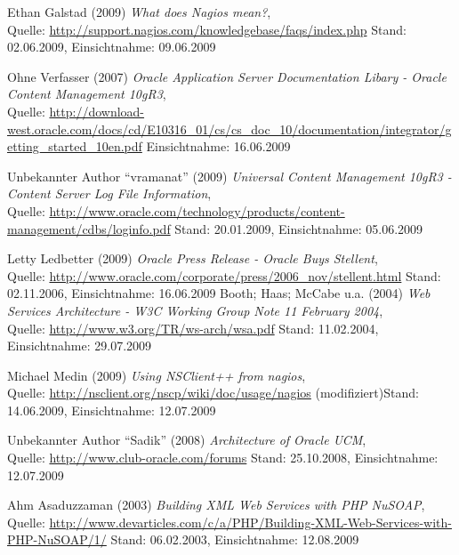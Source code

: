 \documentclass[12pt, a4paper, headsepline]{article}
\newcommand{\pictext}[1]{\glqq\textit{#1}\grqq }
\begin{document}
\begin{thebibliography}{xxxxxxxxxx}
 		 	 	  Ethan Galstad (2009) \pictext{What does Nagios mean?}, \\ Quelle: \url{http://support.nagios.com/knowledgebase/faqs/index.php} \newline Stand: 02.06.2009, Einsichtnahme: 09.06.2009 	 
	 
	  Ohne Verfasser (2007) \pictext{Oracle Application Server Documentation Libary - Oracle Content Management 10gR3}, \\ Quelle: \url{http://download-west.oracle.com/docs/cd/E10316_01/cs/cs_doc_10/documentation/integrator/getting_started_10en.pdf} \newline Einsichtnahme: 16.06.2009
	 
	 	  Unbekannter Author "`vramanat"' (2009) \pictext{Universal Content Management 10gR3 - Content Server Log File Information}, \\ Quelle: \url{http://www.oracle.com/technology/products/content-management/cdbs/loginfo.pdf} \newline Stand: 20.01.2009, Einsichtnahme: 05.06.2009
	 	 
	 	  Letty Ledbetter (2009) \pictext{Oracle Press Release - Oracle Buys Stellent}, \\ Quelle: \url{http://www.oracle.com/corporate/press/2006_nov/stellent.html} \newline Stand: 02.11.2006, Einsichtnahme: 16.06.2009
		 \newpage 	 
	 	 	  Booth; Haas; McCabe u.a. (2004) \pictext{Web Services Architecture - W3C Working Group Note 11 February 2004}, \\ Quelle: \url{http://www.w3.org/TR/ws-arch/wsa.pdf} \newline Stand: 11.02.2004, Einsichtnahme: 29.07.2009

	   Michael Medin (2009) \pictext{Using NSClient++ from nagios}, \\ Quelle: \url{http://nsclient.org/nscp/wiki/doc/usage/nagios} (modifiziert)\newline Stand: 14.06.2009, Einsichtnahme: 12.07.2009
	 
	 	  Unbekannter Author "`Sadik"' (2008) \pictext{Architecture of Oracle UCM}, \\ Quelle: \url{http://www.club-oracle.com/forums} \newline Stand: 25.10.2008, Einsichtnahme: 12.07.2009
	 	 
	 	 	 	  Ahm Asaduzzaman (2003) \pictext{Building XML Web Services with PHP NuSOAP}, \\ Quelle: \url{http://www.devarticles.com/c/a/PHP/Building-XML-Web-Services-with-PHP-NuSOAP/1/} \newline Stand: 06.02.2003, Einsichtnahme: 12.08.2009


\end{thebibliography}
\end{document}
